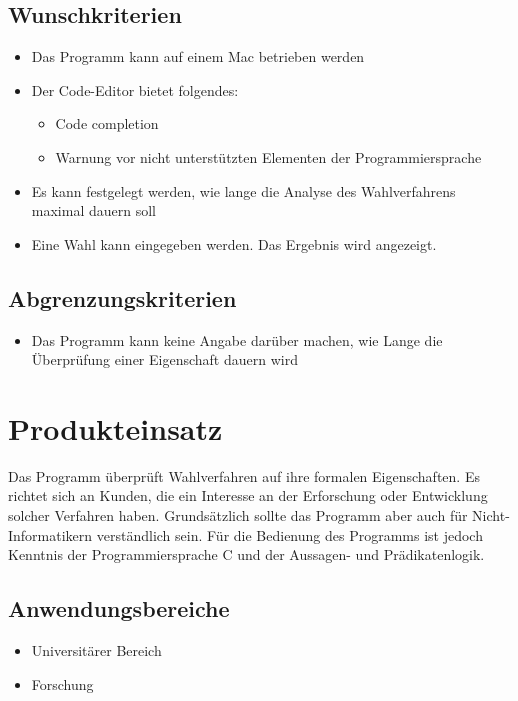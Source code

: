\documentclass[a4paper]{scrreprt}
\begin{document}
\section{Wunschkriterien}
\begin{itemize}
\item Das Programm kann auf einem Mac betrieben werden
\item Der Code-Editor bietet folgendes:
	\begin{itemize}
	\item Code completion
	\item Warnung vor nicht unterstützten Elementen der Programmiersprache
	\end{itemize}
\item Es kann festgelegt werden, wie lange die Analyse des Wahlverfahrens maximal dauern soll
\item Eine Wahl kann eingegeben werden. Das Ergebnis wird angezeigt.
\end{itemize}

\section{Abgrenzungskriterien}
\begin{itemize}
\item Das Programm kann keine Angabe darüber machen, wie Lange die Überprüfung einer Eigenschaft dauern wird
\end{itemize}



\chapter{Produkteinsatz}
Das Programm überprüft Wahlverfahren auf ihre formalen Eigenschaften. Es richtet sich an Kunden, die ein Interesse an der Erforschung oder Entwicklung solcher Verfahren haben. Grundsätzlich sollte das Programm aber auch für Nicht-Informatikern verständlich sein. Für die Bedienung des Programms ist jedoch Kenntnis der Programmiersprache C und der Aussagen- und Prädikatenlogik.

\section{Anwendungsbereiche}
\begin{itemize}
\item Universitärer Bereich
\item Forschung
\end{itemize}
\end{document}
